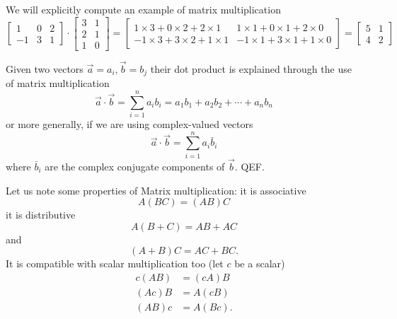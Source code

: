 We will explicitly compute an example of matrix multiplication
\begin{equation}
 \begin{bmatrix}      1 & 0 & 2 \\       -1 & 3 & 1   \end{bmatrix} \cdot   \begin{bmatrix}      3 & 1 \\      2 & 1 \\      1 & 0   \end{bmatrix} = \begin{bmatrix}    1 \times 3 + 0 \times 2 + 2 \times 1 & 1 \times 1 + 0 \times 1 + 2 \times 0 \\   -1 \times 3 + 3 \times 2 + 1 \times 1 & -1 \times 1 + 3 \times 1 + 1 \times 0  \end{bmatrix} = \begin{bmatrix}     5 & 1 \\     4 & 2 \end{bmatrix}
\end{equation}

\begin{ex}
Given two vectors $\vec{a}=a_i,\vec{b}=b_j$ their dot product is explained through the use of matrix multiplication
\begin{equation}
\vec{a}\cdot \vec{b} = \sum_{i=1}^n a_ib_i = a_1b_1 + a_2b_2 + \cdots + a_nb_n 
\end{equation}
or more generally, if we are using complex-valued vectors
\begin{equation}
\vec{a}\cdot \vec{b} = \sum_{i=1}^n a_i\bar{b}_i
\end{equation}
where $\bar{b}_i$ are the complex conjugate components of $\vec{b}$. QEF.
\end{ex}

Let us note some properties of Matrix multiplication: it is associative
\begin{equation}
A(BC) = (AB)C
\end{equation}
it is distributive
\begin{equation}
A(B+C) = AB + AC
\end{equation}
and
\begin{equation}
(A+B)C = AC + BC.
\end{equation}
It is compatible with scalar multiplication too (let $c$ be a scalar)
\begin{equation}
\begin{array}{cc}
c(AB) &= (cA)B\\
(Ac)B &= A(cB)\\
(AB)c &= A(Bc).
\end{array}
\end{equation}

